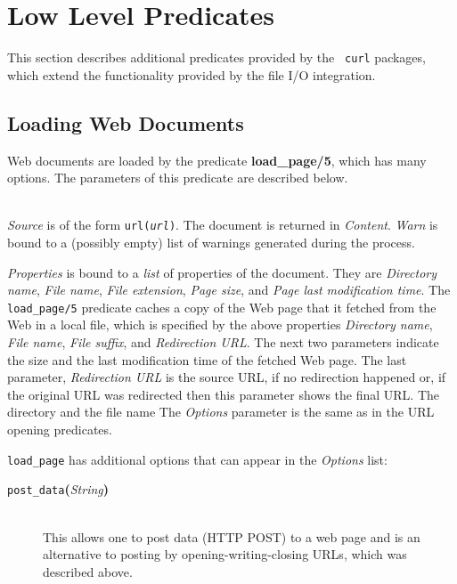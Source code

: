\section{Low Level Predicates}

This section describes additional predicates provided by the {\tt
  curl} packages, which extend the functionality provided by the file I/O
integration.

\subsection{Loading Web Documents}

Web documents are loaded by the predicate {\bf load\_page/5}, which has
many options. The parameters of this predicate are described below.


\begin{description}
\item[load\_page({\it +Source, +Options, -Properties, -Content, -Warn})]\mbox{}
  \\
  {\it Source} is of the form {\tt url({\it {url}})}.
  The document is returned in {\it Content}.
  {\it Warn} is bound to a (possibly empty) list of warnings generated during the process.

  {\it Properties} is bound to a \emph{list} of properties of the document. They
  are {\it Directory name}, {\it File name}, {\it File extension}, {\it
    Page size}, and {\it Page last modification time}.
  The {\tt load\_page/5}  predicate caches a copy of the Web page that it
  fetched from the Web in a local file, which is specified by the above
  properties \emph{Directory name}, \emph{File name}, \emph{File
    suffix}, and \emph{Redirection URL}. The next two parameters indicate
  the size and the last
  modification time of the fetched Web page.
  The last parameter, \emph{Redirection URL} is the source URL, if no
  redirection happened or, if the original URL was redirected then this
  parameter shows the final URL.
  The directory and the file name 
  The \emph{Options} parameter is the same as in the URL opening
  predicates. 

  \texttt{load\_page} has additional options that can appear in the
  \emph{Options} list:
  \begin{description}
  \item[{\tt post\_data}{\bf (}{\it String}{\bf )}]\mbox{}\\
    This allows one to post data (HTTP POST)
    to a web page and is an alternative to
    posting by opening-writing-closing URLs, which was described above.


\end{description}
\end{description}
